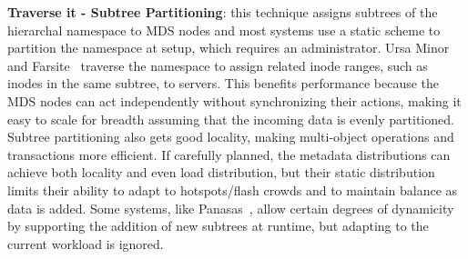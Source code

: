 \textbf{Traverse it - Subtree Partitioning}: this technique assigns subtrees of the hierarchal namespace to MDS nodes and most systems use a static scheme to partition the namespace at setup, which requires an administrator. Ursa Minor~\cite{sinnamohideen:atc2010-ursa} and Farsite~\cite{doucer:osdi2006-farsite-dir} traverse the namespace to assign related inode ranges, such as inodes in the same subtree, to servers. This benefits performance because the MDS nodes can act independently without synchronizing their actions, making it easy to scale for breadth assuming that the incoming data is evenly partitioned.  Subtree partitioning also gets good locality, making multi-object operations and transactions more efficient. If carefully planned, the metadata distributions can achieve both locality and even load distribution, but their static distribution limits their ability to adapt to hotspots/flash crowds and to maintain balance as data is added.  Some systems, like Panasas~\cite{welch:fast2008-panasas}, allow certain degrees of dynamicity by supporting the addition of new subtrees at runtime, but adapting to the current workload is ignored. 



